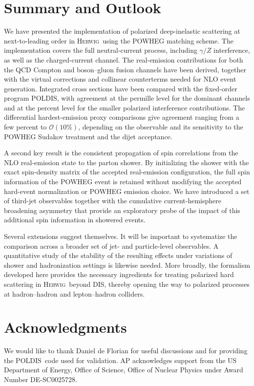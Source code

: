 \documentclass[a4paper,11pt]{article}
\newcommand{\Herwig}{\textsc{Herwig}}
\newcommand{\POLDIS}{\textsc{POLDIS}}
\begin{document}
\FloatBarrier
\section{Summary and Outlook}\label{sec:conclusions}

We have presented the implementation of polarized deep-inelastic scattering at next-to-leading order in \Herwig\ using the POWHEG matching scheme. The implementation covers the full neutral-current process, including $\gamma/Z$ interference, as well as the charged-current channel. The real-emission contributions for both the QCD Compton and boson--gluon fusion channels have been derived, together with the virtual corrections and collinear counterterms needed for NLO event generation. Integrated cross sections have been compared with the fixed-order program \POLDIS, with agreement at the permille level for the dominant channels and at the percent level for the smaller polarized interference contributions. The differential hardest-emission proxy comparisons give agreement ranging from a few percent to $\mathcal{O}(10\%)$, depending on the observable and its sensitivity to the POWHEG Sudakov treatment and the dijet acceptance.

A second key result is the consistent propagation of spin correlations from the NLO real-emission state to the parton shower. By initializing the shower with the exact spin-density matrix of the accepted real-emission configuration, the full spin information of the POWHEG event is retained without modifying the accepted hard-event normalization or POWHEG emission choice. We have introduced a set of third-jet observables together with the cumulative current-hemisphere broadening asymmetry that provide an exploratory probe of the impact of this additional spin information in showered events.

Several extensions suggest themselves. It will be important to systematize the
comparison across a broader set of jet- and particle-level observables. A
quantitative study of the stability of the resulting effects under variations
of shower and hadronization settings is likewise needed. More broadly, the
formalism developed here provides the necessary ingredients for treating
polarized hard scattering in \Herwig\ beyond DIS, thereby opening the way to
polarized processes at hadron--hadron and lepton--hadron colliders.

\section*{Acknowledgments}
We would like to thank Daniel de Florian for useful discussions and for providing the \POLDIS\ code used for validation. AP acknowledges support from the US Department of Energy, Office of Science, Office of Nuclear Physics under Award Number DE-SC0025728.
\appendix
\end{document}
